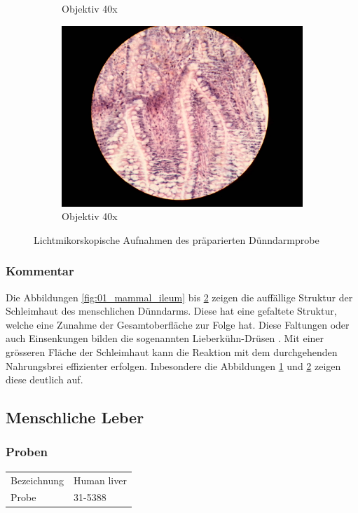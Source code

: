 \begin{figure}[h!]
\begin{subfigure}[b]{0.3\textwidth}
		\caption{Objektiv 40x}
		\label{fig:05_mammal_ileum}
	\end{subfigure}
	\begin{subfigure}[b]{0.3\textwidth}
		\includegraphics[angle=270, width=1\textwidth]{../images/06_mammal_illeum.jpg}
		\caption{Objektiv 40x}
		\label{fig:06_mammal_ileum}
	\end{subfigure}
	\caption{Lichtmikorskopische Aufnahmen des präparierten Dünndarmprobe}
	\label{fig:mammal_ileum}
\end{figure}

\subsubsection{Kommentar}
Die Abbildungen \ref{fig:01_mammal_ileum} bis \ref{fig:06_mammal_ileum}
zeigen die auffällige Struktur der Schleimhaut des menschlichen Dünndarms.
Diese hat eine gefaltete Struktur, welche eine Zunahme der Gesamtoberfläche
zur Folge hat. Diese Faltungen oder auch Einsenkungen bilden die sogenannten
Lieberkühn-Drüsen \cite{wiki-leberkuehn-krypten}. Mit einer grösseren Fläche
der Schleimhaut kann die Reaktion mit dem durchgehenden Nahrungsbrei
effizienter erfolgen. Inbesondere die Abbildungen \ref{fig:05_mammal_ileum}
und \ref{fig:06_mammal_ileum} zeigen diese deutlich auf.

\newpage
\subsection{Menschliche Leber}

\subsubsection{Proben}
\begin{table}[h!]
	\centering
	\begin{tabular}{l l}
		Bezeichnung	& Human liver \\
		Probe 		& 31-5388
	\end{tabular}
\end{table}

